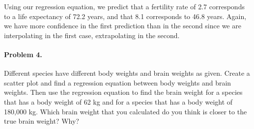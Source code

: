 \documentclass[10pt]{article}
\begin{document}
        Using our regression equation, we predict that a fertility rate of 2.7 corresponds to a life expectancy of 72.2 years,
        and that 8.1 corresponds to 46.8 years.
        Again, we have more confidence in the first prediction than in the second since we are interpolating in the first case, extrapolating 
        in the second.

        \paragraph{Problem 4.} Different species have different body weights and brain weights as given.
        Create a scatter plot and find a regression equation between body weights and brain weights. Then use the regression equation to 
        find the brain weight for a species that has a body weight of 62 kg and for a species that has a body weight of 180,000 kg.
        Which brain weight that you calculated do you think is closer to the true brain weight? Why?\\
\end{document}
